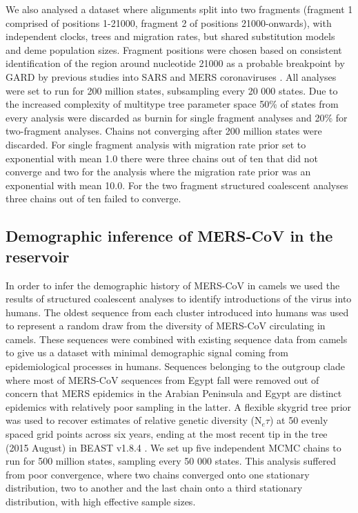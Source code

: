 \documentclass[11pt,oneside,letterpaper]{article}
\def\gdc#1{\textcolor{blue}{[#1]}}
\def\lmc#1{\textcolor{green}{[#1]}}
\begin{document}
We also analysed a dataset where alignments split into two fragments (fragment 1 comprised of positions 1-21000, fragment 2 of positions 21000-onwards), with independent clocks, trees and migration rates, but shared substitution models and deme population sizes.
Fragment positions were chosen based on consistent identification of the region around nucleotide 21000 as a probable breakpoint by GARD \citep{pond_gard:_2006} by previous studies into SARS and MERS coronaviruses \citep{hon_evidence_2008,dudas_mers-cov_2016}.
All analyses were set to run for 200 million states, subsampling every 20 000 states.
Due to the increased complexity of multitype tree parameter space 50\% of states from every analysis were discarded as burnin for single fragment analyses and 20\% for two-fragment analyses.
Chains not converging after 200 million states were discarded.
For single fragment analysis with migration rate prior set to exponential with mean 1.0 there were three chains out of ten that did not converge and two for the analysis where the migration rate prior was an exponential with mean 10.0.
For the two fragment structured coalescent analyses three chains out of ten failed to converge.

\subsection*{Demographic inference of MERS-CoV in the reservoir}
In order to infer the demographic history of MERS-CoV in camels we used the results of structured coalescent analyses to identify introductions of the virus into humans.
The oldest sequence from each cluster introduced into humans was used to represent a random draw from the diversity of MERS-CoV circulating in camels.
These sequences were combined with existing sequence data from camels to give us a dataset with minimal demographic signal coming from epidemiological processes in humans.
Sequences belonging to the outgroup clade where most of MERS-CoV sequences from Egypt fall were removed out of concern that MERS epidemics in the Arabian Peninsula and Egypt are distinct epidemics with relatively poor sampling in the latter.
A flexible skygrid tree prior \citep{gill_2013} was used to recover estimates of relative genetic diversity (N$_{e}\tau$) at 50 evenly spaced grid points across six years, ending at the most recent tip in the tree (2015 August) in BEAST v1.8.4 \citep{drummond_bayesian_2012}.
We set up five independent MCMC chains to run for 500 million states, sampling every 50 000 states.
This analysis suffered from poor convergence, where two chains converged onto one stationary distribution, two to another and the last chain onto a third stationary distribution, with high effective sample sizes.%
\end{document}
